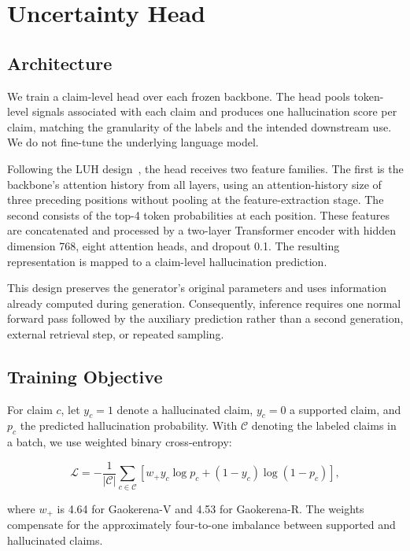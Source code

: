 \documentclass[conference]{IEEEtran}
\begin{document}
\section{Uncertainty Head}

\subsection{Architecture}

We train a claim-level head over each frozen backbone. The head pools token-level signals associated with each claim and produces one hallucination score per claim, matching the granularity of the labels and the intended downstream use. We do not fine-tune the underlying language model.

Following the LUH design~\cite{b14}, the head receives two feature families. The first is the backbone's attention history from all layers, using an attention-history size of three preceding positions without pooling at the feature-extraction stage. The second consists of the top-4 token probabilities at each position. These features are concatenated and processed by a two-layer Transformer encoder with hidden dimension 768, eight attention heads, and dropout 0.1. The resulting representation is mapped to a claim-level hallucination prediction.

This design preserves the generator's original parameters and uses information already computed during generation. Consequently, inference requires one normal forward pass followed by the auxiliary prediction rather than a second generation, external retrieval step, or repeated sampling.

\subsection{Training Objective}

For claim $c$, let $y_c=1$ denote a hallucinated claim, $y_c=0$ a supported claim, and $p_c$ the predicted hallucination probability. With $\mathcal{C}$ denoting the labeled claims in a batch, we use weighted binary cross-entropy:

\begin{equation}
\mathcal{L} =
-\frac{1}{|\mathcal{C}|}
\sum_{c\in\mathcal{C}}
\left[
w_{+} y_c \log p_c
+
(1-y_c)\log(1-p_c)
\right],
\end{equation}

where $w_{+}$ is 4.64 for Gaokerena-V and 4.53 for Gaokerena-R. The weights compensate for the approximately four-to-one imbalance between supported and hallucinated claims.
\end{document}
